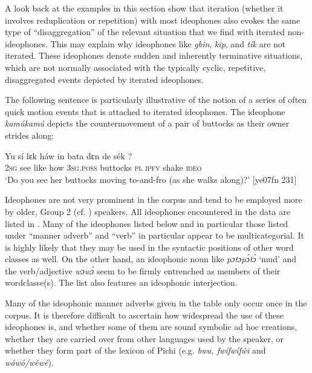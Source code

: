 A look back at the examples in this section show that iteration (whether it involves reduplication or repetition) with most ideophones also evokes the same type of “disaggregation” of the relevant situation that we find with iterated non-ideophones. This may explain why ideophones like \textit{gbin}, \textit{kip}, and \textit{tík} are not iterated. These ideophones denote sudden and inherently terminative situations, which are not normally associated with the typically cyclic, repetitive, disaggregated events depicted by iterated ideophones. 



The following sentence is particularly illustrative of the notion of a series of often quick motion events\index{} that is attached to iterated ideophones. The ideophone \textit{kamúkamú} depicts the countermovement of a pair of buttocks as their owner strides along: 



\ea%
    \label{ex:key:1623}
    \gll Yu  sí  lɛk  háw    in    bata    dɛn  de  sék    ?\\
\textsc{2sg}  see  like  how    \textsc{3sg.poss}  buttocks  \textsc{pl}  \textsc{ipfv}  shake  \textsc{ideo}\\

\glt ‘Do you see her buttocks moving to-and-fro (as she walks along)?’ [ye07fn 231]
\z

Ideophones are not very prominent in the corpus and tend to be employed more by older, Group 2 (cf. ) speakers. All ideophones encountered in the data are listed in . Many of the ideophones listed below and in particular those listed under “manner adverb” and “verb” in particular appear to be multicategorial. It is highly likely that they may be used in the syntactic positions of other word classes as well. On the other hand, an ideophonic noun like \textit{pɔtɔpɔ́tɔ́} ‘mud’ and the verb/adjective \textit{wɔwɔ́} seem to be firmly entrenched as members of their wordclasse(s). The list also features an ideophonic interjection. 


Many of the ideophonic manner adverbs given in the table only occur once in the corpus. It is therefore difficult to ascertain how widespread the use of these ideophones is, and whether some of them are sound symbolic ad hoc creations, whether they are carried over from other languages used by the speaker, or whether they form part of the lexicon of Pichi (e.g. \textit{bwa, fwífwíf\'{w}i} and \textit{wówó/wéwé}).


